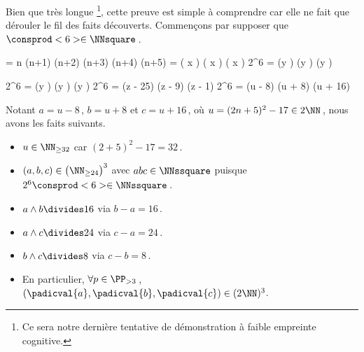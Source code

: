 Bien que très longue
\footnote{
	Ce sera notre dernière tentative de démonstration à faible empreinte cognitive.
},
cette preuve est simple à comprendre car elle ne fait que dérouler le fil des faits découverts.
Commençons par supposer que $\consprod<6> \in \NNsquare$\,.

\medskip
\noindent\kern-10pt%
\begin{stepcalc}[style = ar*, ope = \iff]
	 = 
		n (n+1) (n+2) (n+3) (n+4) (n+5)
	\consprod<6> = 
		\big( x \pm {} \big) \big( x \pm {} \big) \big( x \pm {} \big)
%
	2^6 \consprod<6> = 
		(y ) (y ) (y )
\end{stepcalc}

\noindent\kern-10pt%
\begin{stepcalc}[style = ar*, ope = \iff]
	2^6 \consprod<6> = 
		(y ) (y ) (y )
	2^6 \consprod<6> = 
		(z - 25) (z - 9) (z - 1) 
	2^6 \consprod<6> = 
		(u - 8) (u + 8) (u + 16)
\end{stepcalc}

\medskip

Notant $a = u - 8$\,, $b = u + 8$ et $c = u + 16$\,, où $u = (2 n + 5)^2 - 17 \in 2 \NN$\,, nous avons les faits suivants.

\begin{itemize}
	\item $u \in \NN_{\geq 32}$ car $(2 + 5)^2 - 17 = 32$\,.

	\item $(a, b, c) \in \big( \NN_{\geq 24} \big)^3$ avec $abc \in \NNssquare$ puisque $2^6 \consprod<6> \in \NNssquare$\,.

	\item $a \wedge b \divides 16$ via $b - a = 16$\,.

	\item $a \wedge c \divides 24$ via $c - a = 24$\,.

	\item $b \wedge c \divides 8$  via $c - b = 8$\,.

	\item En particulier, 
	$\forall p \in \PP_{>3}$\,, 
	$(\padicval{a}, \padicval{b}, \padicval{c}) \in ( 2 \NN )^3$.
\end{itemize}

